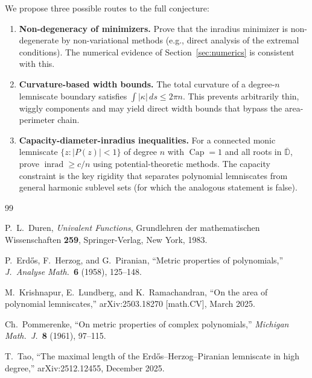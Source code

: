 \documentclass[11pt,a4paper]{amsart}
\theoremstyle{definition}
\newcommand{\D}{\mathbb{D}}
\newcommand{\abs}[1]{\lvert #1 \rvert}
\newcommand{\inrad}{\operatorname{inrad}}
\renewcommand{\Cap}{\operatorname{Cap}}
\begin{document}
We propose three possible routes to the full conjecture:
\begin{enumerate}
  \item \textbf{Non-degeneracy of minimizers.}
    Prove that the inradius minimizer is non-degenerate by
    non-variational methods (e.g., direct analysis of the
    extremal conditions).  The numerical evidence of
    Section~\ref{sec:numerics} is consistent with this.

  \item \textbf{Curvature-based width bounds.}
    The total curvature of a degree-$n$ lemniscate boundary
    satisfies $\int \abs{\kappa}\,ds \leq 2\pi n$.
    This prevents arbitrarily thin, wiggly components and may
    yield direct width bounds that bypass the area-perimeter chain.

  \item \textbf{Capacity-diameter-inradius inequalities.}
    For a connected monic lemniscate $\{z : \abs{P(z)} < 1\}$
    of degree $n$ with $\Cap = 1$ and all roots in $\overline{\D}$,
    prove $\inrad \geq c/n$ using potential-theoretic methods.
    The capacity constraint is the key rigidity that separates
    polynomial lemniscates from general harmonic sublevel sets
    (for which the analogous statement is false).
\end{enumerate}


\begin{thebibliography}{99}

P.~L.~Duren, \emph{Univalent Functions},
Grundlehren der mathematischen Wissenschaften \textbf{259},
Springer-Verlag, New York, 1983.

P.~Erd\H{o}s, F.~Herzog, and G.~Piranian,
``Metric properties of polynomials,''
\emph{J.\ Analyse Math.}\ \textbf{6} (1958), 125--148.

M.~Krishnapur, E.~Lundberg, and K.~Ramachandran,
``On the area of polynomial lemniscates,''
arXiv:2503.18270 [math.CV], March 2025.

Ch.~Pommerenke,
``On metric properties of complex polynomials,''
\emph{Michigan Math.\ J.}\ \textbf{8} (1961), 97--115.

T.~Tao,
``The maximal length of the Erd\H{o}s--Herzog--Piranian lemniscate in high degree,''
arXiv:2512.12455, December 2025.

\end{thebibliography}
\end{document}
